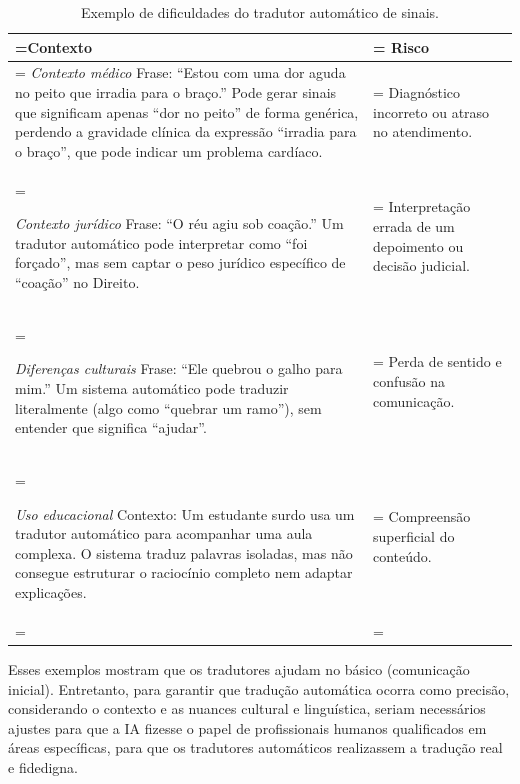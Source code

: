 \documentclass[portuguese]{textolivre}
\begin{document}
\begin{table}[htbp]
    \centering
    \caption{Exemplo de dificuldades do tradutor automático de sinais.}
    \label{tab1}
    \begin{tabularx}{\textwidth}{>{\hsize=1.4\hsize\linewidth=\hsize}X>{\hsize=0.6\hsize\linewidth=\hsize}X}
        \toprule
        Contexto & Risco \\ \midrule
        \arrayrulecolor[gray]{.7}
        \emph{Contexto médico} \newline
        Frase: ``Estou com uma dor aguda no peito que irradia para o braço.'' Pode gerar sinais que significam apenas ``dor no peito'' de forma genérica, perdendo a gravidade clínica da expressão ``irradia para o braço'', que pode indicar um problema cardíaco. & 
        Diagnóstico incorreto ou atraso no atendimento. \\ \midrule
        
        \emph{Contexto jurídico} \newline
        Frase: ``O réu agiu sob coação.'' Um tradutor automático pode interpretar como ``foi forçado'', mas sem captar o peso jurídico específico de ``coação'' no Direito. & 
        Interpretação errada de um depoimento ou decisão judicial. \\ \midrule
        
        \emph{Diferenças culturais} \newline
        Frase: ``Ele quebrou o galho para mim.'' Um sistema automático pode traduzir literalmente (algo como ``quebrar um ramo''), sem entender que significa ``ajudar''. & 
        Perda de sentido e confusão na comunicação. \\ \midrule
        
        \emph{Uso educacional} \newline
        Contexto: Um estudante surdo usa um tradutor automático para acompanhar uma aula complexa. O sistema traduz palavras isoladas, mas não consegue estruturar o raciocínio completo nem adaptar explicações. & 
        Compreensão superficial do conteúdo.\\ 
        \arrayrulecolor{black}
        \bottomrule 
        \end{tabularx}
\begin{flushleft}
    \end{flushleft}
    \end{table}

Esses exemplos mostram que os tradutores ajudam no básico (comunicação inicial). Entretanto, para garantir que tradução automática ocorra como precisão, considerando o contexto e as nuances cultural e linguística, seriam necessários ajustes para que a IA fizesse o papel de profissionais humanos qualificados em áreas específicas, para que os tradutores automáticos realizassem a tradução real e fidedigna.
\end{document}
